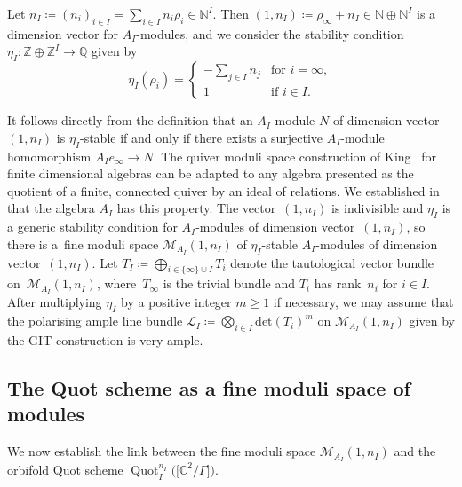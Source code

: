 \documentclass[10pt,a4paper]{amsart}
\newcommand{\SC}{\mathbb{C}} %
\newcommand{\PiQ}{A}
\DeclareMathOperator{\Quot}{\mathrm{Quot}}
\newcommand{\QuotI}[1][ ]{\Quot_I^{#1}}
\newcommand{\QuotInI}{\QuotI[n_I]}
\numberwithin{equation}{section}
\begin{document}
Let
$n_I \coloneqq {(n_i)_{i\in I}}= \sum_{i \in I} n_i \rho_i \in \mathbb{N}^{I}$.
Then $(1,n_I)\coloneqq\rho_{\infty} +n_I \in \mathbb{N} \oplus \mathbb{N}^{I}$
is a dimension vector for $\PiQ_I$-modules, and we consider the stability condition $\eta_{I}\colon \mathbb{Z} \oplus \mathbb{Z}^{I} \to \mathbb{Q}$
given by
\begin{equation}
 \label{eqn:etaI}
\eta_I (\rho_i) =
\begin{cases}
\displaystyle -\sum_{j \in I} n_j & \textrm{for } i= \infty, \\
1 & \textrm{if }i \in I.
\end{cases}
\end{equation}

It follows directly from the definition that an $\PiQ_I$-module $N$ of dimension vector $(1,n_I)$ is $\eta_I$-stable if and only if
there exists a surjective $\PiQ_I$-module homomorphism $\PiQ_I e_{\infty} \to N$.
The quiver moduli space construction of King~\cite[Proposition~5.3]{king1994moduli} for finite dimensional algebras can be adapted to any algebra presented as the quotient of a finite, connected quiver by an ideal of relations. We established in \cite[Proposition~3.3]{craw2019punctual} that the algebra $\PiQ_I$ has this property.
The vector~$(1,n_I)$ is indivisible and $\eta_I$ is a generic stability condition for $\PiQ_I$-modules of dimension vector~$(1,n_I)$, so there is a~fine moduli space $\mathcal{M}_{\PiQ_I}(1,n_I)$
of $\eta_I$-stable $\PiQ_I$-modules of dimension
vector~$(1,n_I)$. Let $T_I \coloneqq\bigoplus_{i \in \{\infty \}\cup I } T_i$ denote the tautological vector bundle on~$\mathcal{M}_{\PiQ_I}(1,n_I)$, where~$T_{\infty}$ is the trivial bundle and $T_i$ has rank~$n_i$ for $i \in I$.
After multiplying $\eta_I$ by a positive integer $m\geq 1$ if necessary, we may assume that the polarising ample line bundle $\mathcal{L}_I \coloneqq \bigotimes_{i \in I} \mathrm{det}(T_i)^{m}$ on $\mathcal{M}_{\PiQ_I}(1,n_I)$ given by the GIT construction is very ample.

\subsection{The Quot scheme as a fine moduli space of modules}
We now establish the link between the fine moduli space $\mathcal{M}_{\PiQ_I}(1,n_I)$ and the orbifold Quot scheme $\QuotInI\big(\big[\SC^2/\Gamma\big]\big)$.
\end{document}
